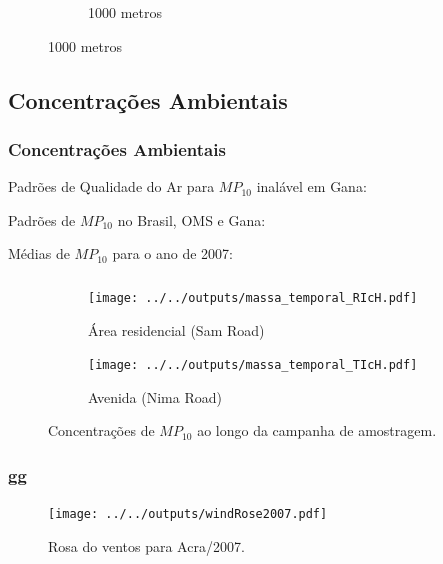 \begin{frame}
\begin{figure}[H]
\begin{subfigure}[b]{0.5\linewidth}
    \caption{1000 metros}
  \end{subfigure}
\end{figure}
\end{frame}

\subsection{Concentrações Ambientais}
\begin{frame}
  \frametitle{Concentrações Ambientais}
  Padrões de Qualidade do Ar para $MP_{10}$ inalável em Gana:
  \begin{table}[H]
  \centering
  \tiny 
    
  \end{table}
  
 Padrões de $MP_{10}$ no Brasil, OMS e Gana:
  \begin{table}[H]
  \centering
  \tiny 
    
  \end{table}
  
Médias de $MP_{10}$ para o ano de 2007:
    \begin{table}[H]
      \centering
      \tiny 
      

    \end{table}
\end{frame}


\begin{frame}
  \frametitle{}
  \begin{figure}[H]
    \centering
    \begin{subfigure}[b]{0.45\textwidth}
      \texttt{[image: ../../outputs/massa\_temporal\_RIcH.pdf]}
      \caption{Área residencial (Sam Road)}
    \end{subfigure}%
    \begin{subfigure}[b]{0.45\textwidth}
      \texttt{[image: ../../outputs/massa\_temporal\_TIcH.pdf]}
      \caption{Avenida (Nima Road)}
    \end{subfigure}
    \caption{Concentrações de $MP_{10}$ ao longo da campanha de amostragem.
             \label{fig:massa_temporal_mp10}}
  \end{figure}
\end{frame}

\begin{frame}
  \frametitle{gg}
  \begin{figure}[H]
    \centering
    \texttt{[image: ../../outputs/windRose2007.pdf]}
    \caption{Rosa do ventos para Acra/2007. \label{fg:rosaCompleta}}
  \end{figure}
\end{frame}



